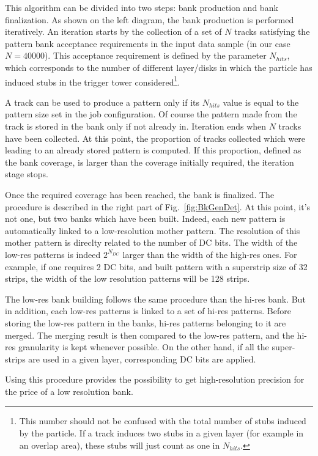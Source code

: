 \noindent This algorithm can be divided into two steps: bank production and bank finalization. As shown on the left diagram, the bank production is performed iteratively. An iteration starts by the collection of a set of $N$ tracks satisfying the pattern bank acceptance requirements in the input data sample (in our case $N=40000$). This acceptance requirement is defined by the parameter $N_{hits}$, which corresponds to the number of different layer/disks in which the particle has induced stubs in the trigger tower considered\footnote{This number should not be confused with the total number of stubs induced by the particle. If a track induces two stubs in a given layer (for example in an overlap area), these stubs will just count as one in $N_{hits}$.}.

\noindent A track can be used to produce a pattern only if its $N_{hits}$ value is equal to the pattern size set in the job configuration. Of course the pattern made from the track is stored in the bank only if not already in. Iteration ends when $N$ tracks have been collected. At this point, the proportion of tracks collected which were leading to an already stored pattern is computed. If this proportion, defined as the bank coverage, is larger than the coverage initially required, the iteration stage stops.

\noindent Once the required coverage has been reached, the bank is finalized. The procedure is described in the right part of Fig.~\ref{fig:BkGenDet}. At this point, it's not one, but two banks which have been built. Indeed, each new pattern is automatically linked to a low-resolution mother pattern. The resolution of this mother pattern is direclty related to the number of DC bits. The width of the low-res patterns is indeed $2^{N_{DC}}$ larger than the width of the high-res ones. For example, if one requires 2 DC bits, and built pattern with a superstrip size of 32 strips, the width of the low resolution patterns will be 128 strips. 

\noindent The low-res bank building follows the same procedure than the hi-res bank. But in addition, each low-res patterns is linked to a set of hi-res patterns. Before storing the low-res pattern in the banks, hi-res patterns belonging to it are merged. The merging result is then compared to the low-res pattern, and the hi-res granularity is kept whenever possible. On the other hand, if all the super-strips are used in a given layer, corresponding DC bits are applied.

\noindent Using this procedure provides the possibility to get high-resolution precision for the price of a low resolution bank. 


